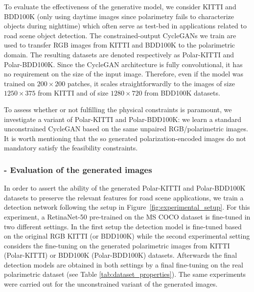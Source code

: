 To evaluate the effectiveness of the generative model, we consider KITTI \citep{Geiger2012} and BDD100K \citep{Yu2020}(only using daytime images since polarimetry fails to characterize objects during nighttime) which often serve as test-bed in applications related to road scene object detection. The constrained-output CycleGANs we train are used to transfer RGB images from KITTI and BDD100K to the polarimetric domain. The resulting datasets are denoted respectively as Polar-KITTI and Polar-BDD100K. Since the CycleGAN architecture is fully convolutional, it has no requirement on the size of the input image. Therefore, even if the model was trained on $200 \times 200$ patches, it scales straightforwardly to the images of size $1250 \times 375$ from KITTI and of size $1280 \times 720$ from BDD100K datasets.

To assess whether or not fulfilling the physical  constraints is paramount, we investigate a variant of Polar-KITTI and Polar-BDD100K: we learn a standard unconstrained CycleGAN based on the same unpaired RGB/polarimetric images. It is worth mentioning that the so generated polarization-encoded images do not mandatory satisfy the feasibility constraints. 

\subsubsection{- Evaluation of the generated images} \label{subsec:eval_gen_img}
In order to assert the ability of the generated Polar-KITTI and Polar-BDD100K datasets to preserve the relevant features for road scene applications, we train a detection network following the setup in Figure~\ref{fig:experimental_setup}. For this experiment, a RetinaNet-50 \citep{Lin2017} pre-trained on the MS COCO dataset \citep{Lin2014} is fine-tuned in two different settings. In the first setup the detection model is fine-tuned based on the original RGB KITTI (or BDD100K) while the second experimental setting considers the fine-tuning on the generated polarimetric images from KITTI (Polar-KITTI) or BDD100K (Polar-BDD100K) datasets. Afterwards the final detection models are obtained in both settings by a final fine-tuning on the real polarimetric dataset (see Table \ref{tab:dataset_properties}). The same experiments were carried out for the unconstrained variant of the generated images.

